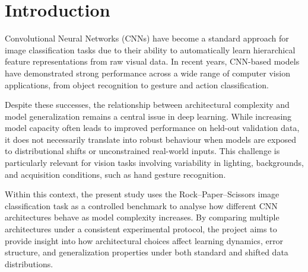 \documentclass{article}
\begin{document}
\begin{abstract}
This project investigates the impact of architectural complexity on the performance and 
robustness of convolutional neural networks for image classification, using the 
Rock--Paper--Scissors hand gesture task as a controlled case study. Three CNN architectures 
with progressively increasing capacity are designed and compared under identical training 
conditions, including consistent data preprocessing, augmentation, and optimization strategies. 
Model selection is guided by a constrained hyperparameter tuning procedure based on validation 
accuracy. Beyond standard in-distribution evaluation, particular emphasis is placed on 
generalization under domain shift through testing on an external dataset of unconstrained, 
real-world images. The experimental results reveal a clear relationship between model capacity 
and in-distribution performance, while also highlighting that strong validation accuracy does 
not necessarily guarantee robustness to distributional changes. The findings underscore the importance 
of evaluating neural network models beyond held-out validation data when assessing their 
reliability in real-world deployment scenarios.
\end{abstract}


\newpage
\section{Introduction}

Convolutional Neural Networks (CNNs) have become a standard approach for image
classification tasks due to their ability to automatically learn hierarchical
feature representations from raw visual data. In recent years, CNN-based models
have demonstrated strong performance across a wide range of computer vision
applications, from object recognition to gesture and action classification.

Despite these successes, the relationship between architectural complexity and
model generalization remains a central issue in deep learning. While increasing
model capacity often leads to improved performance on held-out validation data,
it does not necessarily translate into robust behaviour when models are exposed
to distributional shifts or unconstrained real-world inputs. This challenge is
particularly relevant for vision tasks involving variability in lighting,
backgrounds, and acquisition conditions, such as hand gesture recognition.

Within this context, the present study uses the Rock--Paper--Scissors image
classification task as a controlled benchmark to analyse how different CNN
architectures behave as model complexity increases. By comparing multiple
architectures under a consistent experimental protocol, the project aims to
provide insight into how architectural choices affect learning dynamics,
error structure, and generalization properties under both standard and shifted
data distributions.
\end{document}
